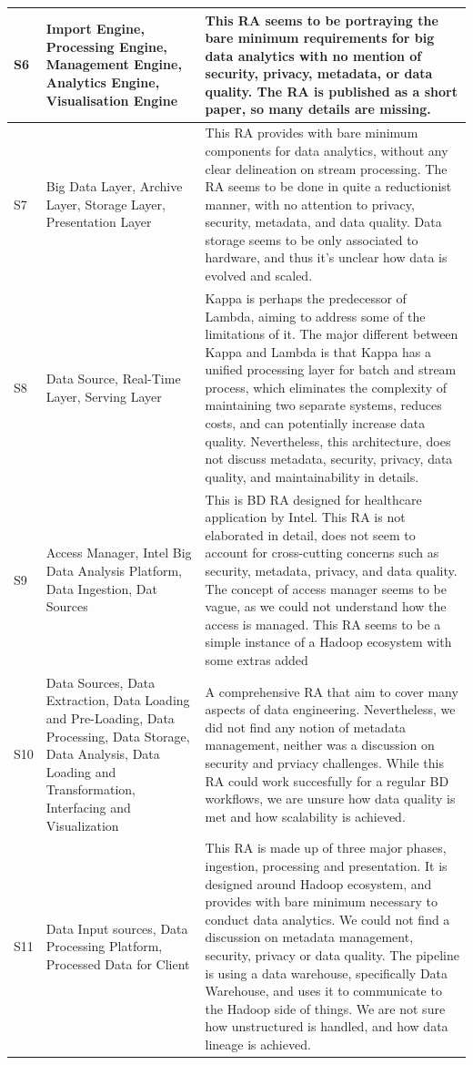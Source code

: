 \documentclass[review]{elsarticle}
\begin{document}
\begin{table}[h!]
\begin{tabular}{ |p{0.5cm}|p{3cm}|p{7.5cm}| }
        \hline
        S6 & Import Engine, Processing Engine, Management Engine, Analytics Engine, Visualisation Engine & This RA seems to be portraying the bare minimum requirements for big data analytics with no mention of security, privacy, metadata, or data quality. The RA is published as a short paper, so many details are missing. \\
        \hline
        S7 & Big Data Layer, Archive Layer, Storage Layer, Presentation Layer & This RA provides with bare minimum components for data analytics, without any clear delineation on stream processing. The RA seems to be done in quite a reductionist manner, with no attention to privacy, security, metadata, and data quality. Data storage seems to be only associated to hardware, and thus it's unclear how data is evolved and scaled.  \\
        \hline
        S8 & Data Source, Real-Time Layer, Serving Layer  & Kappa is perhaps the predecessor of Lambda, aiming to address some of the limitations of it. The major different between Kappa and Lambda is that Kappa has a unified processing layer for batch and stream process, which eliminates the complexity of maintaining two separate systems, reduces costs, and can potentially increase data quality. Nevertheless, this architecture, does not discuss metadata, security, privacy, data quality, and maintainability in details.  \\
        \hline
        S9 & Access Manager, Intel Big Data Analysis Platform, Data Ingestion, Dat Sources  & This is BD RA designed for healthcare application by Intel. This RA is not elaborated in detail, does not seem to account for cross-cutting concerns such as security, metadata, privacy, and data quality. The concept of access manager seems to be vague, as we could not understand how the access is managed. This RA seems to be a simple instance of a Hadoop ecosystem with some extras added   \\
        \hline
        S10 & Data Sources, Data Extraction, Data Loading and Pre-Loading, Data Processing, Data Storage, Data Analysis, Data Loading and Transformation, Interfacing and Visualization &  A comprehensive RA that aim to cover many aspects of data engineering. Nevertheless, we did not find any notion of metadata management, neither was a discussion on security and prviacy challenges. While this RA could work succesfully for a regular BD workflows, we are unsure how data quality is met and how scalability is achieved.  \\
        S11 & Data Input sources, Data Processing Platform, Processed Data for Client &  This RA is made up of three major phases, ingestion, processing and presentation. It is designed around Hadoop ecosystem, and provides with bare minimum necessary to conduct data analytics. We could not find a discussion on metadata management, security, privacy or data quality. The pipeline is using a data warehouse, specifically Data Warehouse, and uses it to communicate to the Hadoop side of things. We are not sure how unstructured is handled, and how data lineage is achieved.  \\

\end{tabular}
\end{table}
\end{document}
